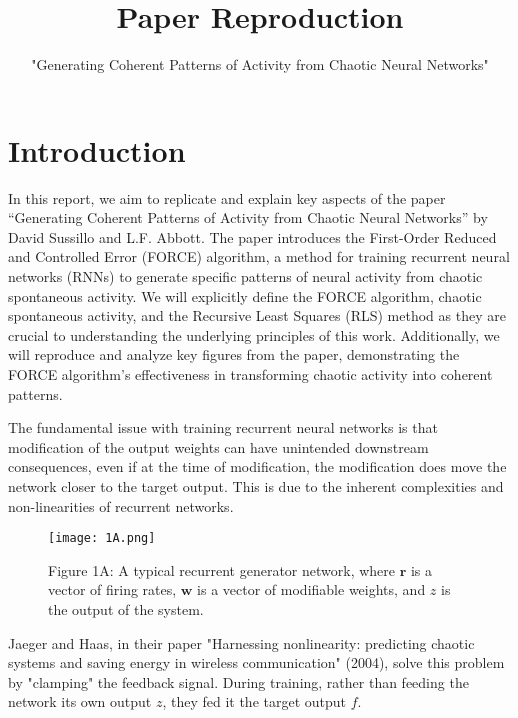 \documentclass{article}
\makeatletter
\renewcommand{\maketitle}{
    {\raggedleft  %
    \vspace*{-10pt}  %
    {\large\@title \par}  %
    \vspace{5pt}  %
    {\normalsize\@author \par}
    \vspace{5pt}  %
    {\normalsize\@date \par}
    \vspace{20pt}}  %
}
\makeatother
\begin{document}
\title{Paper Reproduction}
\author{"Generating Coherent Patterns of Activity
from Chaotic Neural Networks"}
\date{}
\maketitle

\pagestyle{empty} %
\thispagestyle{empty}

\renewcommand{\thesection}{1.\arabic{section}}

\section*{Introduction}
\vspace{.5em}

In this report, we aim to replicate and explain key aspects of the paper “Generating Coherent Patterns of Activity from Chaotic Neural Networks” by David Sussillo and L.F. Abbott. The paper introduces the First-Order Reduced and Controlled Error (FORCE) algorithm, a method for training recurrent neural networks (RNNs) to generate specific patterns of neural activity from chaotic spontaneous activity. We will explicitly define the FORCE algorithm, chaotic spontaneous activity, and the Recursive Least Squares (RLS) method as they are crucial to understanding the underlying principles of this work. Additionally, we will reproduce and analyze key figures from the paper, demonstrating the FORCE algorithm’s effectiveness in transforming chaotic activity into coherent patterns.
\vspace{1em}

The fundamental issue with training recurrent neural networks is that modification of the output weights can have unintended downstream consequences, even if at the time of modification, the modification does move the network closer to the target output. This is due to the inherent complexities and non-linearities of recurrent networks.

\begin{figure}[ht]
    \centering
    \texttt{[image: 1A.png]}
    \captionsetup{font=normalsize, width=1\textwidth, labelformat=empty}
    \caption{Figure 1A: A typical recurrent generator network, where $\boldsymbol{r}$ is a vector of firing rates, $\boldsymbol{w}$ is a vector of modifiable weights, and $z$ is the output of the system.}
\end{figure}

Jaeger and Haas, in their paper "Harnessing nonlinearity: predicting chaotic systems and saving energy in wireless communication" (2004), solve this problem by "clamping" the feedback signal. During training, rather than feeding the network its own output $z$, they fed it the target output $f$.
\vspace{1em}
\end{document}
